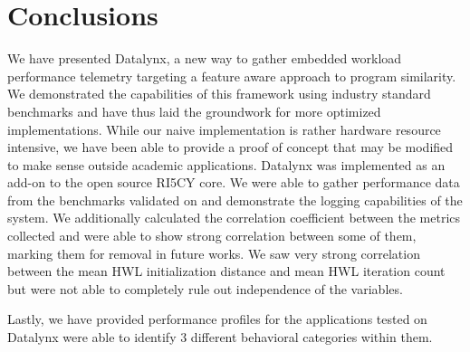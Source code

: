 \documentclass[../bachelor_paper.tex]{subfiles}
\begin{document}
\chapter{Conclusions}
    \label{ch:conc}
    
We have presented Datalynx, a new way to gather embedded workload performance telemetry targeting a feature aware approach to program similarity. We demonstrated the capabilities of this framework using industry standard benchmarks and have thus laid the groundwork for more optimized implementations. While our naive implementation is rather hardware resource intensive, we have been able to provide a proof of concept that may be modified to make sense outside academic applications. Datalynx was implemented as an add-on to the open source RI5CY core. We were able to gather performance data from the benchmarks validated on and demonstrate the logging capabilities of the system. We additionally calculated the correlation coefficient between the metrics collected and were able to show strong correlation between some of them, marking them for removal in future works. We saw very strong correlation between the mean \ac{HWL} initialization distance and mean \ac{HWL} iteration count but were not able to completely rule out independence of the variables.

Lastly, we have provided performance profiles for the applications tested on Datalynx were able to identify 3 different behavioral categories within them.

\isstandalone



\fi
\end{document}
